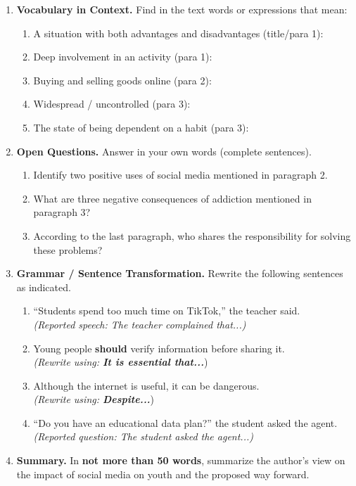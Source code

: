 \documentclass[11pt]{article}
\begin{document}
\begin{exercice}
\begin{enumerate}
\item \textbf{Vocabulary in Context.} Find in the text words or expressions that mean:
\begin{enumerate}
\item A situation with both advantages and disadvantages (title/para 1): \dotfill
\item Deep involvement in an activity (para 1): \dotfill
\item Buying and selling goods online (para 2): \dotfill
\item Widespread / uncontrolled (para 3): \dotfill
\item The state of being dependent on a habit (para 3): \dotfill
\end{enumerate}

\item \textbf{Open Questions.} Answer in your own words (complete sentences).
\begin{enumerate}
\item Identify two positive uses of social media mentioned in paragraph 2.
\item What are three negative consequences of addiction mentioned in paragraph 3?
\item According to the last paragraph, who shares the responsibility for solving these problems?
\end{enumerate}

\item \textbf{Grammar / Sentence Transformation.} Rewrite the following sentences as indicated.
\begin{enumerate}
\item ``Students spend too much time on TikTok,'' the teacher said. \\
\textit{(Reported speech: The teacher complained that...)}
\item Young people \textbf{should} verify information before sharing it. \\
\textit{(Rewrite using: \textbf{It is essential that...}})
\item Although the internet is useful, it can be dangerous. \\
\textit{(Rewrite using: \textbf{Despite...}})
\item ``Do you have an educational data plan?'' the student asked the agent. \\
\textit{(Reported question: The student asked the agent...)}
\end{enumerate}

\item \textbf{Summary.} In \textbf{not more than 50 words}, summarize the author's view on the impact of social media on youth and the proposed way forward.
\end{enumerate}
\end{exercice}
\end{document}
